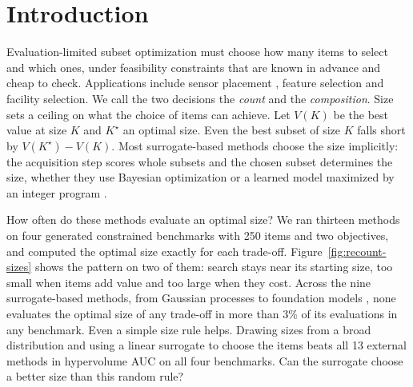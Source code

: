 \documentclass{article}
\newcommand{\revtext}[1]{{\color{blue}#1}}
\theoremstyle{remark}\newtheorem{remark}[proposition]{Remark}
\begin{document}
\section{Introduction}\label{sec:intro}

Evaluation-limited subset optimization must choose how many items to select and which ones, under feasibility constraints that are known in advance and cheap to check.
Applications include sensor placement \citep{krause2008near}, feature selection \citep{guyon2003introduction} and facility selection.
We call the two decisions the \emph{count} and the \emph{composition}.
\revtext{Size sets a ceiling on what the choice of items can achieve. Let $V(K)$ be the best value at size $K$ and $K^\star$ an optimal size. Even the best subset of size $K$ falls short by $V(K^\star)-V(K)$.}
\revtext{Most surrogate-based methods choose the size implicitly: the acquisition step scores whole subsets and the chosen subset determines the size}, whether they use Bayesian optimization \citep{shahriari2015taking,baptista2018bayesian,oh2019combinatorial,pmlr-v139-wan21b,deshwal2023bayesian,papenmeier2023bounce} or a learned model maximized by an integer program \citep{papalexopoulos2022constrained}.

\revtext{How often do these methods evaluate an optimal size?} We ran thirteen methods on \revtext{four generated constrained benchmarks} with 250 items and two objectives, and computed the optimal size exactly for each trade-off.
Figure~\ref{fig:recount-sizes} shows the pattern \revtext{on two of them}: search stays near its starting size, too small when items add value and too large when they cost.
Across the nine surrogate-based methods, from Gaussian processes \citep{daulton2021parallel,ament2023unexpected} to foundation models \citep{hollmann2025accurate,yu2026git}, \revtext{none evaluates the optimal size of any trade-off in more than 3\% of its evaluations in any benchmark}.
\revtext{Even a simple size rule helps. Drawing sizes from a broad distribution and using a linear surrogate to choose the items beats all 13 external methods in hypervolume AUC on all four benchmarks. Can the surrogate choose a better size than this random rule?}
\end{document}
